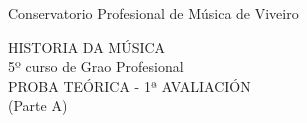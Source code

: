 %
\thispagestyle{empty}
%
\begin{center}
\Large{Conservatorio Profesional de Música de Viveiro}
\par
%
\vspace*{0.70cm}
\huge{ %
HISTORIA DA MÚSICA\\
\vspace*{0.30cm}
}
\large{5º curso de Grao Profesional} \\
%
\vspace*{1.20cm}
\Large{ %
PROBA TEÓRICA - 1ª 
AVALIACIÓN \\
(Parte A)} \\
\vspace*{1.20cm}


\end{center}
